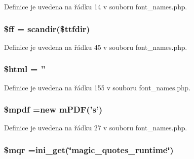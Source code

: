 Definice je uvedena na řádku 14 v souboru font\-\_\-names.\-php.

\hypertarget{font__names_8php_a064fd64c462dd929cd17812cf14ec09e}{
\subsubsection[{\$ff}]{\setlength{\rightskip}{0pt plus 5cm}\$ff = scandir(\$ttfdir)}}\label{font__names_8php_a064fd64c462dd929cd17812cf14ec09e}


Definice je uvedena na řádku 45 v souboru font\-\_\-names.\-php.

\hypertarget{font__names_8php_a6f96e7fc92441776c9d1cd3386663b40}{
\subsubsection[{\$html}]{\setlength{\rightskip}{0pt plus 5cm}\$html = ''}}\label{font__names_8php_a6f96e7fc92441776c9d1cd3386663b40}


Definice je uvedena na řádku 155 v souboru font\-\_\-names.\-php.

\hypertarget{font__names_8php_ad028f81910d6cbab9b184d2214b3a8f8}{
\subsubsection[{\$mpdf}]{\setlength{\rightskip}{0pt plus 5cm}\$mpdf =new {\bf m\-P\-D\-F}('s')}}\label{font__names_8php_ad028f81910d6cbab9b184d2214b3a8f8}


Definice je uvedena na řádku 27 v souboru font\-\_\-names.\-php.

\hypertarget{font__names_8php_ad04a9e91774b9f9d3044e0c2b7636ca1}{
\subsubsection[{\$mqr}]{\setlength{\rightskip}{0pt plus 5cm}\$mqr =ini\-\_\-get(\char`\"{}magic\-\_\-quotes\-\_\-runtime\char`\"{})}}\label{font__names_8php_ad04a9e91774b9f9d3044e0c2b7636ca1}


